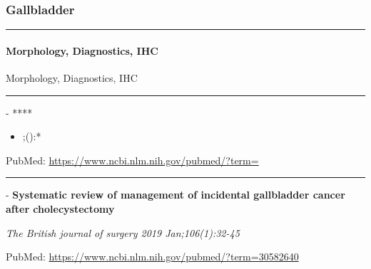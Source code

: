 \documentclass[]{article}
\providecommand{\tightlist}{%
  \setlength{\itemsep}{0pt}\setlength{\parskip}{0pt}}
\let\oldparagraph\paragraph
\renewcommand{\paragraph}[1]{\oldparagraph{#1}\mbox{}}
\begin{document}
\pagebreak

\hypertarget{gallbladder}{%
\subsubsection{Gallbladder}\label{gallbladder}}

\begin{center}\rule{0.5\linewidth}{\linethickness}\end{center}

\hypertarget{morphology-diagnostics-ihc-2}{%
\paragraph{Morphology, Diagnostics,
IHC}\label{morphology-diagnostics-ihc-2}}

Morphology, Diagnostics, IHC

\begin{center}\rule{0.5\linewidth}{\linethickness}\end{center}

 - ****

\begin{itemize}
\tightlist
\item
  ;():*
\end{itemize}

PubMed: \url{https://www.ncbi.nlm.nih.gov/pubmed/?term=}

{}

{}

\begin{center}\rule{0.5\linewidth}{\linethickness}\end{center}

 - \textbf{Systematic review of management of incidental gallbladder
cancer after cholecystectomy}

\emph{The British journal of surgery 2019 Jan;106(1):32-45}

PubMed: \url{https://www.ncbi.nlm.nih.gov/pubmed/?term=30582640}
\end{document}
